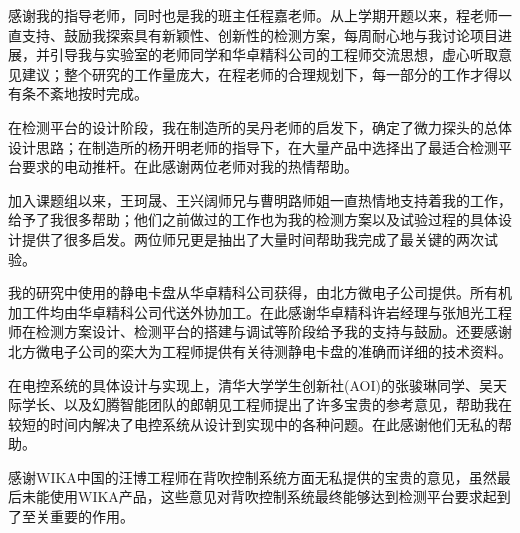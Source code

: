 \begin{ack}
感谢我的指导老师，同时也是我的班主任程嘉老师。从上学期开题以来，程老师一直支持、鼓励我探索具有新颖性、创新性的检测方案，每周耐心地与我讨论项目进展，并引导我与实验室的老师同学和华卓精科公司的工程师交流思想，虚心听取意见建议；整个研究的工作量庞大，在程老师的合理规划下，每一部分的工作才得以有条不紊地按时完成。

在检测平台的设计阶段，我在制造所的吴丹老师的启发下，确定了微力探头的总体设计思路；在制造所的杨开明老师的指导下，在大量产品中选择出了最适合检测平台要求的电动推杆。在此感谢两位老师对我的热情帮助。

加入课题组以来，王珂晟、王兴阔师兄与曹明路师姐一直热情地支持着我的工作，给予了我很多帮助；他们之前做过的工作也为我的检测方案以及试验过程的具体设计提供了很多启发。两位师兄更是抽出了大量时间帮助我完成了最关键的两次试验。

我的研究中使用的静电卡盘从华卓精科公司获得，由北方微电子公司提供。所有机加工件均由华卓精科公司代送外协加工。在此感谢华卓精科许岩经理与张旭光工程师在检测方案设计、检测平台的搭建与调试等阶段给予我的支持与鼓励。还要感谢北方微电子公司的栾大为工程师提供有关待测静电卡盘的准确而详细的技术资料。

在电控系统的具体设计与实现上，清华大学学生创新社(AOI)的张骏琳同学、吴天际学长、以及幻腾智能团队的郎朝见工程师提出了许多宝贵的参考意见，帮助我在较短的时间内解决了电控系统从设计到实现中的各种问题。在此感谢他们无私的帮助。

感谢WIKA中国的汪博工程师在背吹控制系统方面无私提供的宝贵的意见，虽然最后未能使用WIKA产品，这些意见对背吹控制系统最终能够达到检测平台要求起到了至关重要的作用。
\end{ack}
